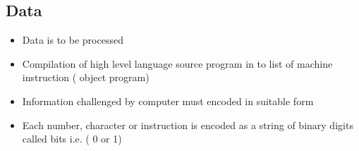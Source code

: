 \documentclass[british]{extreport}
\begin{document}
\subsection{Data}
\begin{itemize}
	\item Data is to be processed
	\item Compilation of high level language source program in to list of machine
	      instruction ( object program)
	\item Information challenged by computer must encoded in suitable form
	\item Each number, character or instruction is encoded as a string of binary
	      digits called bits i.e. ( 0 or 1)
\end{itemize}
\end{document}
